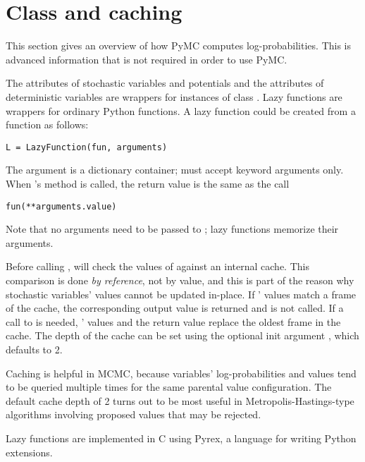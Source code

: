 \section[Class LazyFunction and caching]{Class 
and caching}
\label{sec:caching}
This section gives an overview of how PyMC computes log-probabilities. This is advanced information that is not required in order to use PyMC.

The  attributes of stochastic variables and potentials and the  attributes of deterministic variables are wrappers for instances of class . Lazy functions are wrappers for ordinary Python functions. A lazy function  could be created from a function  as follows:
\begin{verbatim}
L = LazyFunction(fun, arguments)
\end{verbatim}
The argument  is a dictionary container;  must accept keyword arguments only. When 's  method is called, the return value is the same as the call
\begin{verbatim}
fun(**arguments.value)
\end{verbatim}
Note that no arguments need to be passed to ; lazy functions memorize their arguments.

Before calling ,  will check the values of  against an internal cache. This comparison is done \emph{by reference}, not by value, and this is part of the reason why stochastic variables' values cannot be updated in-place. If ' values match a frame of the cache, the corresponding output value is returned and  is not called. If a call to  is needed, ' values and the return value replace the oldest frame in the cache. The depth of the cache can be set using the optional init argument , which defaults to 2.

Caching is helpful in MCMC, because variables' log-probabilities and values tend to be queried multiple times for the same parental value configuration. The default cache depth of 2 turns out to be most useful in Metropolis-Hastings-type algorithms involving proposed values that may be rejected.

Lazy functions are implemented in C using Pyrex, a language for writing Python extensions.
